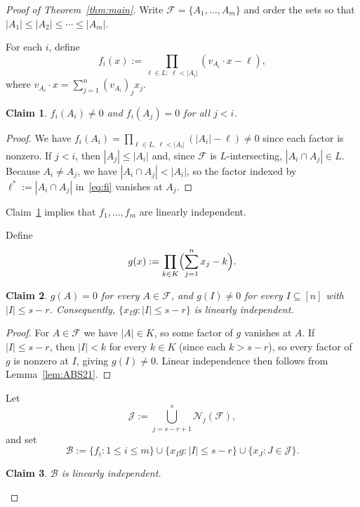 \documentclass[11pt]{article}
\theoremstyle{plain}
\newtheorem{claim}{Claim}[theorem]
\theoremstyle{remark}
\newcommand{\F}{\mathcal{F}}
\newcommand{\N}{\mathcal{N}}
\newcommand{\abs}[1]{\left|#1\right|}
\begin{document}
\begin{proof}[Proof of Theorem~\ref{thm:main}]
Write $\F=\{A_1,\dots,A_m\}$ and order the sets so that
$\abs{A_1}\le\abs{A_2}\le\cdots\le\abs{A_m}$.

\medskip
For each $i$, define
\begin{equation}\label{eq:fi}
  f_i(x):=\prod_{\ell\in L:\ \ell<\abs{A_i}}(v_{A_i}\cdot x-\ell),
\end{equation}
where $v_{A_i}\cdot x=\sum_{j=1}^{n}(v_{A_i})_j x_j$.

\begin{claim}\label{clm:triangular}
$f_i(A_i)\neq 0$ and $f_i(A_j)=0$ for all $j<i$.
\end{claim}

\begin{proof}
We have $f_i(A_i)=\prod_{\ell\in L,\,\ell<\abs{A_i}}(\abs{A_i}-\ell)\neq 0$
since each factor is nonzero.
If $j<i$, then $\abs{A_j}\le\abs{A_i}$ and, since $\F$ is $L$-intersecting,
$\abs{A_i\cap A_j}\in L$.
Because $A_i\neq A_j$, we have $\abs{A_i\cap A_j}<\abs{A_i}$,
so the factor indexed by $\ell^*:=\abs{A_i\cap A_j}$ in~\eqref{eq:fi} vanishes at $A_j$.
\end{proof}

\noindent Claim~\ref{clm:triangular} implies that $f_1,\dots,f_m$ are linearly independent.

\medskip
Define
$$
  g(x):=\prod_{k\in K}\Bigl(\sum_{j=1}^{n}x_j-k\Bigr).
$$

\begin{claim}\label{clm:filter}
$g(A)=0$ for every $A\in\F$, and $g(I)\neq 0$ for every $I\subseteq[n]$ with $\abs{I}\le s-r$.
Consequently, $\{x_I g:\abs{I}\le s-r\}$ is linearly independent.
\end{claim}

\begin{proof}
For $A\in\F$ we have $\abs{A}\in K$, so some factor of $g$ vanishes at $A$.
If $\abs{I}\le s-r$, then $\abs{I}<k$ for every $k\in K$ (since each $k>s-r$),
so every factor of $g$ is nonzero at $I$, giving $g(I)\neq 0$.
Linear independence then follows from Lemma~\ref{lem:ABS21}.
\end{proof}

\medskip
Let
$$
  \mathcal{J}:=\bigcup_{j=s-r+1}^{s}\N_j(\F),
$$
and set
$$
  \mathcal{B}:=\{f_i:1\le i\le m\}\cup\{x_I g:\abs{I}\le s-r\}\cup\{x_J:J\in\mathcal{J}\}.
$$

\begin{claim}\label{clm:lindep}
$\mathcal{B}$ is linearly independent.
\end{claim}


\end{proof}
\end{document}
